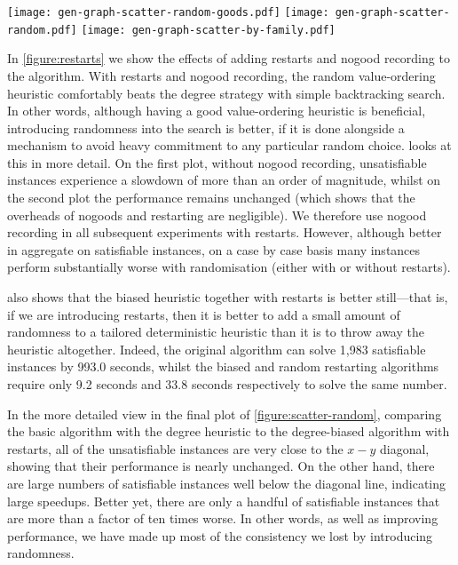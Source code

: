 \documentclass[letterpaper]{article} %
\begin{document}
\begin{figure*}[tb]
    \texttt{[image: gen-graph-scatter-random-goods.pdf]}
    \hfill
    \texttt{[image: gen-graph-scatter-random.pdf]}
    \hfill
    \texttt{[image: gen-graph-scatter-by-family.pdf]}
    \caption{Comparing basic backtracking with the degree heuristic, versus the random and biased
    heuristics with restarts. The first plot does not use nogood recording, whilst the second and
    third do.}
    \label{figure:scatter-random}
\end{figure*}

In \cref{figure:restarts} we show the effects of adding restarts and nogood recording to the
algorithm. With restarts and nogood recording,
the random value-ordering heuristic comfortably beats the degree strategy with simple backtracking
search. In other
words, although having a good value-ordering heuristic is beneficial, introducing randomness into
the search is better, if it is done alongside a mechanism to avoid heavy commitment to any
particular random choice.  looks at
this in more detail. On the first plot, without nogood recording, unsatisfiable instances
experience a slowdown of more than an order of magnitude, whilst on the second plot the
performance remains unchanged (which shows that the overheads of nogoods and restarting are
negligible). We therefore use nogood recording in all subsequent experiments with restarts. However,
although better in aggregate on satisfiable instances, on a case by case basis many instances
perform substantially worse with randomisation (either with or without restarts).

 also shows that the biased heuristic together with restarts is better
still---that is, if we are introducing restarts, then it is better to add a small amount of
randomness to a tailored deterministic heuristic than it is to throw away the heuristic altogether.
Indeed, the original algorithm can solve 1,983 satisfiable instances by 993.0 seconds, whilst the
biased and random restarting algorithms require only 9.2 seconds and 33.8 seconds respectively to
solve the same number.

In the more detailed view in the final plot of \cref{figure:scatter-random}, comparing the
basic algorithm with the degree heuristic to the degree-biased algorithm with restarts, all of the
unsatisfiable instances are very close to the $x-y$ diagonal, showing that their performance is
nearly unchanged. On the other hand, there are large numbers of satisfiable instances well below the
diagonal line, indicating large speedups.  Better yet, there are only a handful of satisfiable
instances that are more than a factor of ten times worse. In other words, as well as improving
performance, we have made up most of the consistency we lost by introducing randomness.
\end{document}
